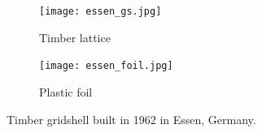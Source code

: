 \begin{figure}[t]
	\begin{subfigure}[b]{\TwoMediaWidth}
		\texttt{[image: essen\_gs.jpg]}
		\caption{Timber lattice}
		\label{fig:essen_a}
	\end{subfigure}%
	\hspace{\MediaGutterWidth}%
	\begin{subfigure}[b]{\TwoMediaWidth}
		\texttt{[image: essen\_foil.jpg]}
		\caption{Plastic foil}
		\label{fig:essen_b}
	\end{subfigure}
	\caption[Timber gridshell built in 1962 in Essen, Germany]{Timber gridshell built in 1962 in Essen, Germany.}
	\label{fig:essen}
\end{figure}




